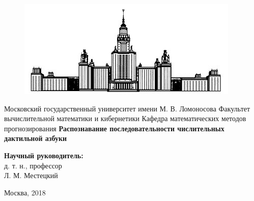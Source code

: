 \documentclass[12pt,a4paper]{article}
\theoremstyle{definition}
\begin{document}
 

\begin{titlepage} 
\newpage %
\begin{center} 
\begin{figure}[h] 
	\center 
	\includegraphics[scale=0.4]{msu2.jpg} 
\end{figure} 
\footnotesize {Московский государственный университет} 
\footnotesize {имени М. В. Ломоносова} 
\linebreak 
\normalsize {Факультет вычислительной математики и кибернетики} 
\linebreak 
\normalsize {Кафедра математических методов прогнозирования} 
\linebreak 
\linebreak 
\linebreak 
\large{} 
\linebreak 
\linebreak 
\large{\textbf{Распознавание последовательности числительных дактильной азбуки}} 
\linebreak 
\linebreak 
\large{} 
\linebreak 
\linebreak 
\end{center} 
\begin{flushright} 
\Large {\bf Научный руководитель:}\\ 
\Large д. т. н., профессор\\ 
\Large Л. М. Местецкий\\ 
\end{flushright} 
\vspace{\fill} 
\begin{center} 
\large{Москва, 2018} 
\end{center} %
\end{titlepage} 
\newpage 
\pagestyle{plain} 
\tableofcontents 

\newpage 
\end{document}
